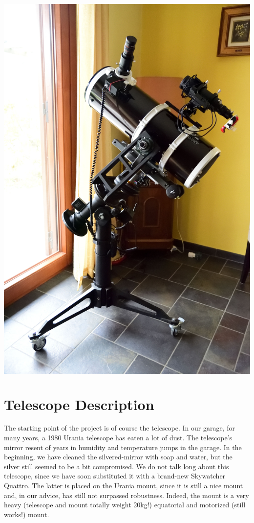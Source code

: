 \documentclass{article}
\begin{document}
    \begin{multicols}{2}

        \tableofcontents

        \begin{minipage}{0.5\textwidth}
            \centering
            \includegraphics[scale=0.4]{DSC_5264_00001.jpg}
        \end{minipage}

        \section{Telescope Description}
        The starting point of the project is of course the telescope.
        In our garage, for many years, a 1980 Urania telescope has eaten a lot of dust.
        The telescope's mirror resent of years in humidity and temperature jumps in the garage.
        In the beginning, we have cleaned the silvered-mirror with soap and water, but the silver still seemed to be a bit compromised.
        We do not talk long about this telescope, since we have soon substituted it with a brand-new Skywatcher Quattro.
        The latter is placed on the Urania mount, since it is still a nice mount and, in our advice, has still not surpassed robustness.
        Indeed, the mount is a very heavy (telescope and mount totally weight 20kg!) equatorial and motorized (still works!) mount.
        

\end{multicols}
\end{document}
